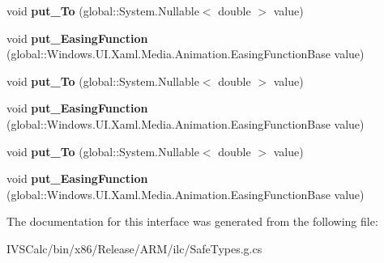 \begin{DoxyCompactItemize}
void {\bfseries put\+\_\+\+To} (global\+::\+System.\+Nullable$<$ double $>$ value)
\item 
\mbox{\label{interface_windows_1_1_u_i_1_1_xaml_1_1_media_1_1_animation_1_1_i_double_animation_ab1345b10d988f66b38c29728641d9fc9}} 
void {\bfseries put\+\_\+\+Easing\+Function} (global\+::\+Windows.\+U\+I.\+Xaml.\+Media.\+Animation.\+Easing\+Function\+Base value)
\item 
\mbox{\label{interface_windows_1_1_u_i_1_1_xaml_1_1_media_1_1_animation_1_1_i_double_animation_a233b0c3571bbe89f0bb12869a5bd4d0d}} 
void {\bfseries put\+\_\+\+To} (global\+::\+System.\+Nullable$<$ double $>$ value)
\item 
\mbox{\label{interface_windows_1_1_u_i_1_1_xaml_1_1_media_1_1_animation_1_1_i_double_animation_ab1345b10d988f66b38c29728641d9fc9}} 
void {\bfseries put\+\_\+\+Easing\+Function} (global\+::\+Windows.\+U\+I.\+Xaml.\+Media.\+Animation.\+Easing\+Function\+Base value)
\item 
\mbox{\label{interface_windows_1_1_u_i_1_1_xaml_1_1_media_1_1_animation_1_1_i_double_animation_a233b0c3571bbe89f0bb12869a5bd4d0d}} 
void {\bfseries put\+\_\+\+To} (global\+::\+System.\+Nullable$<$ double $>$ value)
\item 
\mbox{\label{interface_windows_1_1_u_i_1_1_xaml_1_1_media_1_1_animation_1_1_i_double_animation_ab1345b10d988f66b38c29728641d9fc9}} 
void {\bfseries put\+\_\+\+Easing\+Function} (global\+::\+Windows.\+U\+I.\+Xaml.\+Media.\+Animation.\+Easing\+Function\+Base value)
\end{DoxyCompactItemize}


The documentation for this interface was generated from the following file\+:\begin{DoxyCompactItemize}
\item 
I\+V\+S\+Calc/bin/x86/\+Release/\+A\+R\+M/ilc/Safe\+Types.\+g.\+cs\end{DoxyCompactItemize}
